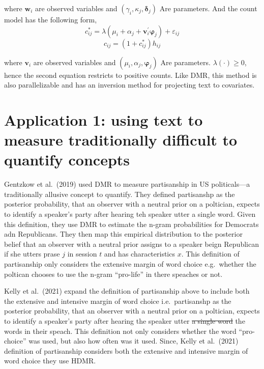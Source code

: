 \documentclass[
]{book}
\begin{document}
where \(\boldsymbol{w}_{i}\) are observed variables and \((\gamma_{i},\kappa_{j},\boldsymbol{\delta}_{j})\) Are parameters. And the count model has the following form,
\[
c_{i j}^{*} =\lambda\left(\mu_{i}+\alpha_{j}+\mathbf{v}_{i}^{\prime} \boldsymbol{\varphi}_{j}\right)+\varepsilon_{i j}
\]
\[
c_{i j} = \left(1+c_{i j}^{*}\right) h_{i j}
\]

where \(\boldsymbol{v}_{i}\) are observed variables and \((\mu_i,\alpha_j,\boldsymbol{\varphi}_{j})\) Are parameters. \(\lambda(\cdot)\geq 0\), hence the second equation restricts to positive counts. Like DMR, this method is also parallelizable and has an inversion method for projecting text to covariates.

\hypertarget{application-1-using-text-to-measure-traditionally-difficult-to-quantify-concepts}{%
\section{Application 1: using text to measure traditionally difficult to quantify concepts}\label{application-1-using-text-to-measure-traditionally-difficult-to-quantify-concepts}}

Gentzkow et al.~(2019) used DMR to measure partisanship in US politicals---a traditionally allusive concept to quantify. They defined partisanshp as the posterior probability, that an observer with a neutral prior on a poltician, expects to identify a speaker's party after hearing teh speaker utter a single word. Given this definition, they use DMR to estimate the n-gram probabilities for Democrats adn Republicans. They then map this empirical distribution to the posterior belief that an observer with a neutral prior assigns to a speaker beign Republican if she utters prase \(j\) in session \(t\) and has characteristics \(x\). This definition of partisanship only considers the extensive margin of word choice e.g.~whether the poltican chooses to use the n-gram ``pro-life'' in there speaches or not.

Kelly et al.~(2021) expand the definition of partisanship above to include both the extensive and intensive margin of word choice i.e.~partisanshp as the posterior probability, that an observer with a neutral prior on a poltician, expects to identify a speaker's party after hearing the speaker utter \sout{a single word} the words in their speach. This definition not only considers whether the word ``pro-choice'' was used, but also how often was it used. Since, Kelly et al.~(2021) definition of partisanship considers both the extensive and intensive margin of word choice they use HDMR.
\end{document}
